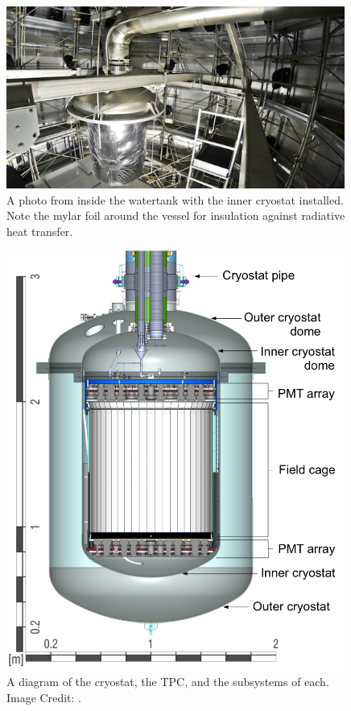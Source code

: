 \begin{figure}[t]
	\centering
	\includegraphics[width=0.99\textwidth]{xe1t_inner_cryostat}
	\caption{A photo from inside the watertank with the inner cryostat installed.  Note the mylar foil around the vessel for insulation against radiative heat transfer.}
	\label{fig:xe1t_inner_cryostat}
\end{figure}

\begin{figure}[p]
	\centering
	\includegraphics[width=0.99\textwidth]{xe1t_cryostat_tpc}
	\caption{A diagram of the cryostat, the TPC, and the subsystems of each.  Image Credit: .}
	\label{fig:xe1t_cryostat_tpc}
\end{figure}

